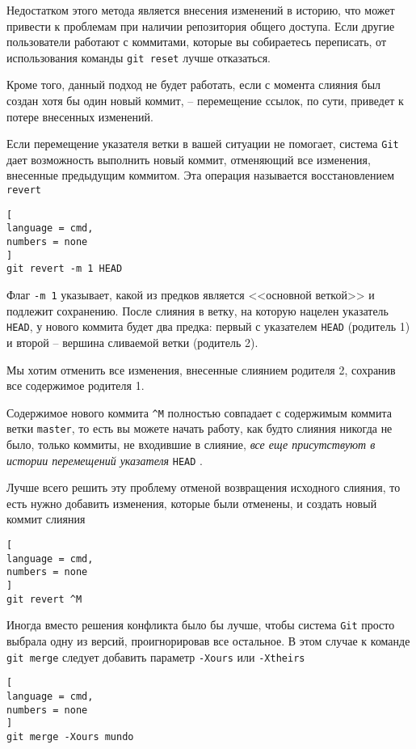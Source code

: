 \documentclass[%
	11pt,
	a4paper,
	utf8,
		]{article}
\begin{document}
Недостатком этого метода является внесения изменений в историю, что может привести к проблемам при наличии репозитория общего доступа. Если другие пользователи работают с коммитами, которые вы собираетесь переписать, от использования команды \texttt{git reset} лучше отказаться.

Кроме того, данный подход не будет работать, если с момента слияния был создан хотя бы один новый коммит, -- перемещение ссылок, по сути, приведет к потере внесенных изменений.

Если перемещение указателя ветки в вашей ситуации не помогает, система \texttt{Git} дает возможность выполнить новый коммит, отменяющий все изменения, внесенные предыдущим коммитом. Эта операция называется восстановлением \texttt{revert}
\begin{lstlisting}[
language = cmd,
numbers = none
]
git revert -m 1 HEAD
\end{lstlisting}

Флаг \texttt{-m 1} указывает, какой из предков является <<основной веткой>> и подлежит сохранению. После слияния в ветку, на которую нацелен указатель \texttt{HEAD}, у нового коммита будет два предка: первый с указателем \texttt{HEAD} (родитель 1) и второй -- вершина сливаемой ветки (родитель 2).

Мы хотим отменить все изменения, внесенные слиянием родителя 2, сохранив все содержимое родителя 1.

Содержимое нового коммита \verb|^M| полностью совпадает с содержимым коммита ветки \texttt{master}, то есть вы можете начать работу, как будто слияния никогда не было, только коммиты, не входившие в слияние, \emph{все еще присутствуют в истории перемещений указателя} \texttt{HEAD} \cite[]{chacon:2020}.

Лучше всего решить эту проблему отменой возвращения исходного слияния, то есть нужно добавить изменения, которые были отменены, и создать новый коммит слияния
\begin{lstlisting}[
language = cmd,
numbers = none
]
git revert ^M
\end{lstlisting}

Иногда вместо решения конфликта было бы лучше, чтобы система \texttt{Git} просто выбрала одну из версий, проигнорировав все остальное. В этом случае к команде \texttt{git merge} следует добавить параметр \texttt{-Xours} или \texttt{-Xtheirs}
\begin{lstlisting}[
language = cmd,
numbers = none
]
git merge -Xours mundo
\end{lstlisting}
\end{document}
